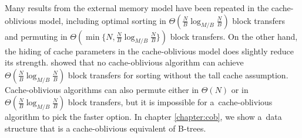 Many results from the external memory model have been repeated in the
cache-oblivious model, including optimal sorting in
$\Theta(\frac{N}{B}\log_{M/B}\frac{N}{B})$ block transfers and permuting
in $\Theta(\min\{N,\frac{N}{B}\log_{M/B}\frac{N}{B}\})$ block transfers.
On the other hand, the hiding of cache parameters in the cache-oblivious model
does slightly reduce its strength. \cite{limits-of-co} showed that no
cache-oblivious algorithm can achieve
$\Theta(\frac{N}{B}\log_{M/B}\frac{N}{B})$ block transfers for sorting
without the tall cache assumption. Cache-oblivious algorithms can also permute
either in $\Theta(N)$ or in $\Theta(\frac{N}{B}\log_{M/B}\frac{N}{B})$ block
transfers, but it is impossible for a~cache-oblivious algorithm to pick
the faster option.
In chapter \ref{chapter:cob}, we show a~data structure that is a
cache-oblivious equivalent of B-trees.
